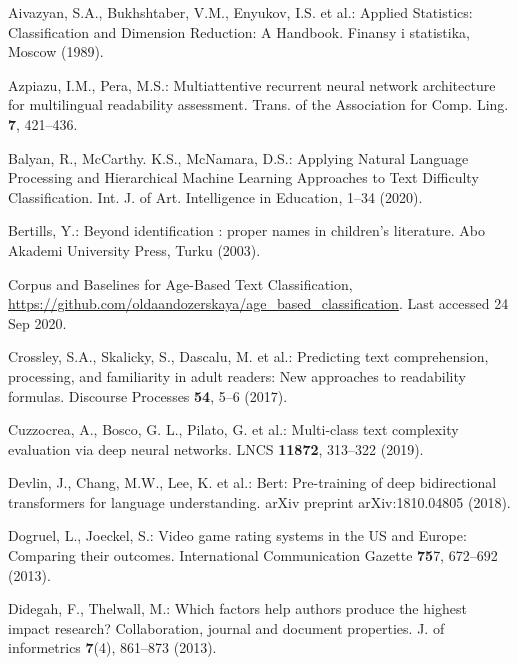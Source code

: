\documentclass[runningheads]{llncs}
\begin{document}
\begin{thebibliography}{37}

Aivazyan, S.A., Bukhshtaber, V.M., Enyukov, I.S. et al.: Applied Statistics: Classification and Dimension Reduction: A Handbook. Finansy i statistika, Moscow (1989).

 Azpiazu, I.M., Pera, M.S.: Multiattentive recurrent neural network architecture for multilingual readability assessment. Trans. of the Association for Comp. Ling. \textbf{7}, 421--436. 

Balyan, R., McCarthy. K.S., McNamara, D.S.: Applying Natural Language Processing and Hierarchical Machine Learning Approaches to Text Difficulty Classification. Int. J. of Art. Intelligence in Education, 1--34 (2020).  

Bertills, Y.: Beyond identification : proper names in children's literature. Abo Akademi University Press, Turku (2003).

Corpus and Baselines for Age-Based Text Classification, \url{https://github.com/oldaandozerskaya/age\_based\_classification}. Last accessed 24 Sep 2020.

Crossley, S.A., Skalicky, S., Dascalu, M. et al.: Predicting text comprehension, processing, and familiarity in adult readers: New approaches to readability formulas. Discourse Processes \textbf{54}, 5--6 (2017). 

Cuzzocrea, A., Bosco, G. L., Pilato, G. et al.: Multi-class text complexity evaluation via deep neural networks. LNCS \textbf{11872}, 313--322 (2019).  

Devlin, J., Chang, M.W., Lee, K. et al.:  Bert: Pre-training of deep bidirectional transformers for language understanding. arXiv preprint arXiv:1810.04805 (2018).

Dogruel, L., Joeckel, S.: Video game rating systems in the US and Europe: Comparing their outcomes. International Communication Gazette \textbf{75}7, 672--692 (2013).

Didegah, F., Thelwall, M.: Which factors help authors produce the highest impact research? Collaboration, journal and document properties. J. of informetrics \textbf{7}(4), 861--873 (2013). 


\end{thebibliography}
\end{document}
